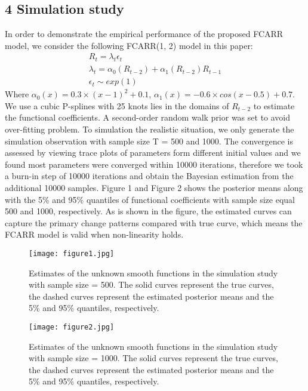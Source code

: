 \documentclass[
journal=jacsat, %
manuscript=article]{achemso}
\begin{document}
\begin{CJK*}{UTF8}{song}
\section{4 Simulation study}
In order to demonstrate the empirical performance of the proposed FCARR model, we consider the following FCARR(1, 2) model in this paper:
\begin{gather}
	R_t = \lambda_t \epsilon_t \nonumber \\
    \lambda_t = \alpha_0(R_{t-2}) + \alpha_1(R_{t-2})R_{t-1} \\
    \epsilon_t \sim exp(1) \nonumber
\end{gather}
Where $\alpha_0(x) = 0.3 \times (x-1)^2 + 0.1$, $\alpha_1(x) = -0.6 \times cos(x - 0.5) + 0.7$. We use a cubic P-splines with 25 knots lies in the domains of $R_{t-2}$ to estimate the functional coefficients. A second-order random walk prior was set to avoid over-fitting problem. To simulation the realistic situation, we only generate the simulation observation with sample size T = 500 and 1000. The convergence is assessed by viewing trace plots of parameters form different initial values and we found most parameters were converged within 10000 iterations, therefore we took a burn-in step of 10000 iterations and obtain the Bayesian estimation from the additional 10000 samples. Figure 1 and Figure 2 shows the posterior means along with the 5\% and 95\% quantiles of functional coefficients with sample size equal 500 and 1000, respectively. As is shown in the figure, the estimated curves can capture the primary change patterns compared with true curve, which means the FCARR model is valid when non-linearity holds.

\begin{figure}[H]
\centering
\texttt{[image: figure1.jpg]}\\
\captionsetup{justification = raggedright}
\caption{Estimates of the unknown smooth functions in the simulation study with sample size = 500. The solid curves represent the true curves, the dashed curves represent the estimated posterior means and the 5\% and 95\% quantiles, respectively.}
\end{figure}
\begin{figure}[H]
\centering
\texttt{[image: figure2.jpg]}\\
\captionsetup{justification = raggedright}
\caption{Estimates of the unknown smooth functions in the simulation study with sample size = 1000. The solid curves represent the true curves, the dashed curves represent the estimated posterior means and the 5\% and 95\% quantiles, respectively.}
\end{figure}


\end{CJK*}
\end{document}
